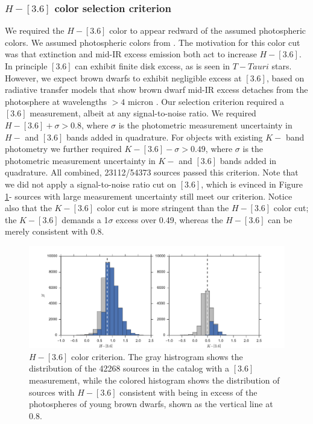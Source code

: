 \documentclass[12pt,preprint]{aastex}
\begin{document}
\subsubsection{$H-[3.6]$ color selection criterion}
We required the $H-[3.6]$ color to appear redward of the assumed photospheric colors.  We assumed photospheric colors from \citet{2006ApJ...651..502P}.  The motivation for this color cut was that extinction and mid-IR excess emission both act to increase $H-[3.6]$.  In principle $[3.6]$ can exhibit finite disk excess, as is seen in $T-Tauri$ stars.  However, we expect brown dwarfs to exhibit negligible excess at $[3.6]$, based on radiative transfer models that show brown dwarf mid-IR excess detaches from the photosphere at wavelengths $>4$ micron \citep{2009MNRAS.394L.141E}.  Our selection criterion required a $[3.6]$ measurement, albeit at any signal-to-noise ratio.  We required $H-[3.6] + \sigma > 0.8$, where $\sigma$ is the photometric measurement uncertainty in $H-$ and $[3.6]$ bands added in quadrature.  For objects with existing $K-$ band photometry we further required $K-[3.6] - \sigma > 0.49$, where $\sigma$ is the photometric measurement uncertainty in $K-$ and $[3.6]$ bands added in quadrature.  All combined, 23112/54373 sources passed this criterion.  Note that we did not apply a signal-to-noise ratio cut on $[3.6]$, which is evinced in Figure \ref{fig_midIR_phot_sel}- sources with large measurement uncertainty still meet our criterion.  Notice also that the $K-[3.6]$ color cut is more stringent than the $H-[3.6]$ color cut; the $K-[3.6]$ demands a 1$\sigma$ excess over 0.49, whereas the $H-[3.6]$ can be merely consistent with 0.8.

\begin{figure}[ht!]
  \caption{$H-[3.6]$ color criterion.  The gray histrogram shows the distribution of the 42268 sources in the catalog with a $[3.6]$ measurement, while the colored histogram shows the distribution of sources with $H-[3.6]$ consistent with being in excess of the photospheres of young brown dwarfs, shown as the vertical line at 0.8.\label{fig_midIR_phot_sel}}
\centering
\includegraphics[scale=0.6]{figures/midIR_phot_sel}
\end{figure}
\end{document}

